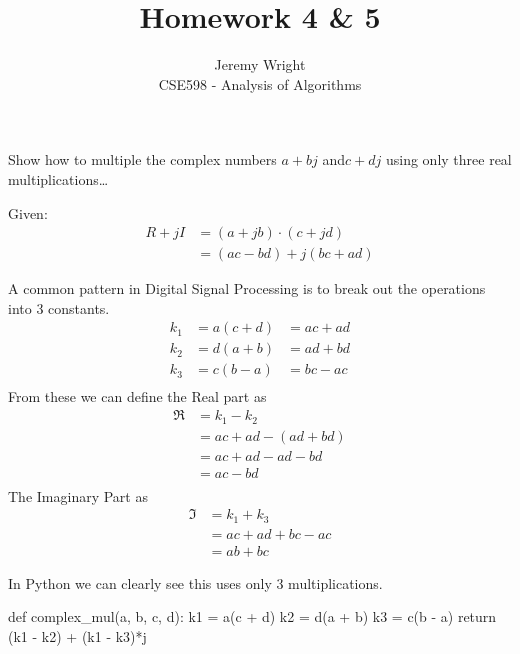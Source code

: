 \documentclass[12pt]{article}
\newenvironment{problem}[2][Problem]{\begin{trivlist}
\item[\hskip \labelsep {\bfseries #1}\hskip \labelsep {\bfseries #2.}]}{\end{trivlist}}
\begin{document}
 
 
\title{Homework 4 \& 5}%
\author{Jeremy Wright\\ %
CSE598 - Analysis of Algorithms} %
 
\maketitle
\begin{problem}{1}
    Show how to multiple the complex numbers $a+bj$ and$c+dj$ using only three
    real multiplications\dots

    Given: 
        \begin{align*}
        R+jI &= (a+jb)\cdot(c+jd) \\
        &= (ac - bd) + j(bc + ad)
    \end{align*}

    A common pattern in Digital Signal Processing is to break out the operations
    into 3 constants.
    \begin{align*}
        \label{eq:components}
        k_1 &= a(c + d) &= ac + ad \\
        k_2 &= d(a + b) &= ad + bd \\
        k_3 &= c(b - a) &= bc - ac \\
    \end{align*}
    From these we can define the Real part as
    \begin{align*}
        \Re &= k_1 - k_2 \\
            &= ac + ad - (ad + bd) \\
            &= ac + ad - ad - bd \\
            &= ac - bd \\
    \end{align*}
    The Imaginary Part as
    \begin{align*}
        \Im &= k_1 + k_3            \\
            &= ac + ad + bc - ac    \\
            &= ab + bc
    \end{align*}

    In Python we can clearly see this uses only 3 multiplications.
    \begin{python}
        def complex_mul(a, b, c, d):
            k1 = a(c + d)
            k2 = d(a + b)
            k3 = c(b - a)
            return (k1 - k2) + (k1 - k3)*j
    \end{python}
\end{problem}
\end{document}
